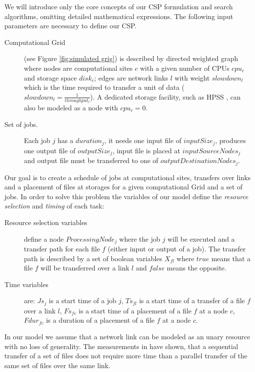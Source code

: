 \documentclass[english]{ddny}
\begin{document}
We will introduce only the core concepts of our CSP formulation and search algorithms, omitting  detailed mathematical expressions.
The following input parameters are necessary to define our CSP.
\begin{description}
\item[Computational Grid] (see Figure \ref{fig:simulated grig}) is described by directed weighted graph where nodes are computational sites $c$ with a given number of CPUs $cpu_{c}$ and storage space $disk_{c}$; edges are network links $l$ with weight $slowdown_{l}$ which is the time required to transfer a unit of data ($slowdown_{l}=\frac{1}{throughput_{l}}$). A dedicated storage facility, such as HPSS \cite{HPSS}, can also be modeled as a node with $cpu_{c}=0$.
\item[Set of jobs.] Each job $j$ has a $duration_{j}$, it needs one input file of $inputSize_{j}$, produces one output file of $outputSize_{j}$, input file is placed at $inputSourceNodes_{j}$ and output file must be transferred to one of $outputDestinationNodes_{j}$.
\end{description}
Our goal is to create a schedule of jobs at computational sites, transfers over links and a placement of files at storages for a given computational Grid and a set of jobs. In order to solve this problem the variables of our model define the \textit{resource selection} and  \textit{timing} of each task:
\begin{description}
\item[Resource selection variables] define a node $ProcessingNode_{j}$ where the job $j$ will be executed and a transfer path for each file $f$ (either input or output of a job). The transfer path is described by a set of boolean variables $X_{fl}$ where $true$ means that a file $f$ will be transferred over a link $l$ and $false$ means the opposite.
\item[Time variables] are: $Js_{j}$ is a start time of a job $j$, $Ts_{fl}$ is a start time of a transfer of a file $f$ over a link $l$, $Fs_{fc}$ is a start time of a placement of a file $f$ at a node $c$, $Fdur_{fc}$ is a duration of a placement of a file $f$ at a node $c$.
\end{description} 	 
 In our model we assume that a network link can be modeled as an unary resource with no loss of generality. The measurements in \cite{Zerola} have shown, that  a sequential transfer of a set of files does not require more time than a parallel transfer of the same set of files over the same link.
\end{document}
